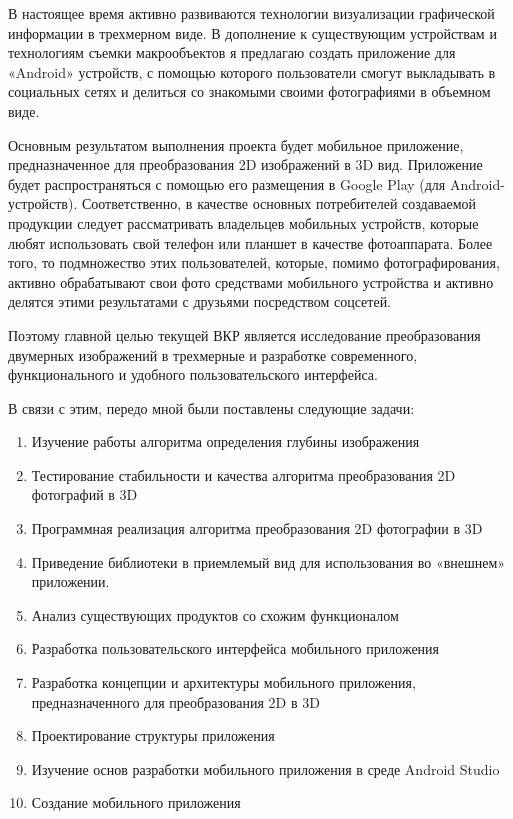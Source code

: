 В настоящее  время активно развиваются технологии визуализации графической информации в трехмерном виде. В дополнение к существующим устройствам и технологиям съемки макрообъектов я предлагаю создать приложение для «Android» устройств, с помощью которого пользователи смогут выкладывать в социальных сетях и делиться со знакомыми своими фотографиями в объемном виде.

Основным результатом выполнения проекта будет мобильное приложение, предназначенное для преобразования 2D изображений в 3D вид. Приложение будет распространяться с помощью его размещения в Google Play (для Android-устройств). Соответственно, в качестве основных потребителей создаваемой продукции следует рассматривать владельцев мобильных устройств, которые любят использовать свой телефон или планшет в качестве фотоаппарата. Более того, то подмножество этих пользователей, которые, помимо фотографирования, активно обрабатывают свои фото средствами мобильного устройства и активно делятся этими результатами с друзьями посредством соцсетей.

Поэтому главной целью текущей ВКР является исследование	преобразования двумерных изображений в трехмерные и разработке современного, функционального и удобного пользовательского интерфейса.

В связи с этим, передо мной были поставлены следующие задачи:

\begin{enumerate}
	\item Изучение работы алгоритма определения глубины изображения
	\item Тестирование стабильности и качества алгоритма преобразования 2D фотографий в 3D
	\item Программная реализация алгоритма преобразования 2D фотографии в 3D
	\item Приведение библиотеки в приемлемый вид для использования во «внешнем» приложении.
	\item Анализ существующих продуктов со схожим функционалом
	\item Разработка пользовательского интерфейса мобильного приложения
	\item Разработка концепции и архитектуры мобильного приложения, предназначенного для преобразования 2D в 3D
	\item Проектирование структуры приложения
	\item Изучение основ разработки мобильного приложения в среде Android Studio
	\item Создание мобильного приложения

\end{enumerate}